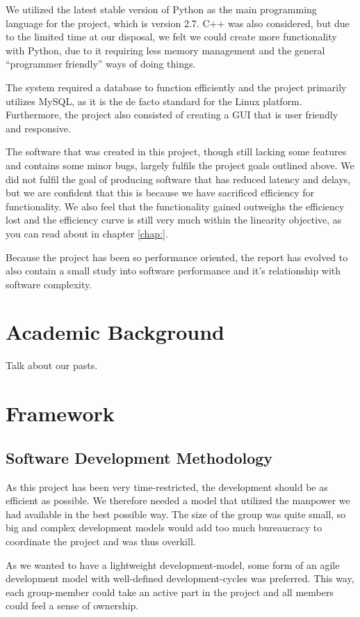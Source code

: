 We utilized the latest stable version of Python as the main programming language
for the project, which is version 2.7. C++ was also considered, but due to the
limited time at our disposal, we felt we could create more functionality with Python, due to it requiring less
memory management and the general “programmer friendly” ways of doing things.

The system required a database to function efficiently and the project
primarily utilizes MySQL, as it is the de facto standard for the Linux
platform. Furthermore, the project also consisted of creating a GUI that is user
friendly and responsive. 

The software that was created in this project, though still lacking some
features and contains some minor bugs, largely fulfils the project goals
outlined above. We did not fulfil the goal of producing software that has
reduced latency and delays, but we are confident that this is because we have
sacrificed efficiency for functionality. We also feel that the functionality
gained outweighs the efficiency lost and the efficiency curve is still very much
within the linearity objective, as you can read about in chapter \ref{chap:}.

Because the project has been so performance oriented, the report has evolved to
also contain a small study into software performance and it's relationship with
software complexity. 


\section{Academic Background}
Talk about our pasts.

\section{Framework}
\subsection{Software Development Methodology}
As this project has been very time-restricted, the development should be as
efficient as possible. We therefore needed a model that utilized the manpower we
had available in the best possible way.
The size of the group was quite small, so big and complex development models
would add too much bureaucracy to coordinate the project and was thus overkill.

As we wanted to have a lightweight development-model, some form of an agile
development model with well-defined development-cycles was preferred. This way,
each group-member could take an active part in the project and all members could
feel a sense of ownership.

